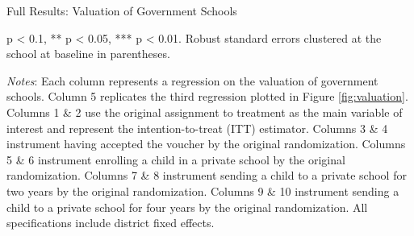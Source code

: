 \documentclass[hidelinks, 12pt, titlepage]{article}
\begin{document}
\begin{landscape}
				\clearpage

				\begin{table}
					\begin{threeparttable}
						\centering
						\caption{Full Results: Valuation of Government Schools\label{table:appendixvaluationgovschools}}
						
						\begin{tablenotes}
							\item * p < 0.1, ** p < 0.05, *** p < 0.01. Robust standard errors clustered at the school at baseline in parentheses.
							\item \emph{Notes}: Each column represents a regression on the valuation of government schools.  Column 5 replicates the third regression plotted in Figure \ref{fig:valuation}.  Columns 1 \& 2 use the original assignment to treatment as the main variable of interest and represent the intention-to-treat (ITT) estimator.  Columns 3 \& 4 instrument having accepted the voucher by the original randomization.  Columns 5 \& 6 instrument enrolling a child in a private school by the original randomization.  Columns 7 \& 8 instrument sending a child to a private school for two years by the original randomization.  Columns 9 \& 10 instrument sending a child to a private school for four years by the original randomization.  All specifications include district fixed effects.
						\end{tablenotes}
					\end{threeparttable}
				\end{table}

				\end{landscape}

				\clearpage
\end{document}
